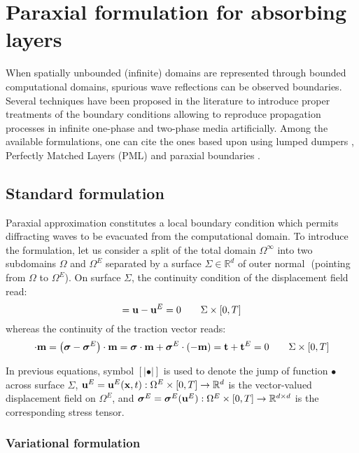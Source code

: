 \section{Paraxial formulation for absorbing layers}

When spatially unbounded (infinite) domains are represented through bounded computational domains, spurious wave reflections can be observed boundaries.
Several techniques have been proposed in the literature to introduce proper treatments of the boundary conditions allowing to reproduce propagation processes in infinite one-phase and two-phase media artificially. Among the available formulations, one can cite the ones based upon using lumped dumpers \cite{lysmer1969finite}, Perfectly Matched Layers
(PML) \cite{berenger1994perfectly} and paraxial boundaries \cite{engquist1977absorbing,clayton1977absorbing,aubry1985local,MODARESSI1994117}.

\subsection{Standard formulation}

Paraxial approximation constitutes a local boundary condition which permits diffracting waves to be evacuated from the computational domain. To introduce the formulation, let us consider a split of the total domain $\Omega^{\infty}$ into two subdomains $\Omega$ and $\Omega^{E}$ separated by a surface $\Sigma\in\mathbb{R}^{d}$ of outer normal $\bm{}$ (pointing from $\Omega$ to $\Omega^{E}$). On surface $\Sigma$, the continuity condition of the displacement field read:
\begin{equation}
[|\bu|]=\bu-\bu^{E}=0\qquad\Sigma\times[0,T]
\end{equation}
%
whereas the continuity of the traction vector reads:
%
\begin{equation}
[|\bsigma|]\cdot\bm{}=\left(\bsigma-\bsigma^{E}\right)\cdot\bm{}=\bsigma\cdot\bm{}+\bsigma^{E}\cdot(-\bm{})=\bt+\bt^{E}=0\qquad\Sigma\times[0,T]\label{eq:paraxial_continuity_t}
\end{equation}

In previous equations, symbol $[|\bullet|]$ is used to denote the jump of function $\bullet$ across surface $\Sigma$, ${\bf{u}}^{E}={\bf{u}}^{E}({\bf{x}},t):\Omega^{E}\times[0,T]\to\mathbb{R}^{d}$ is the vector-valued displacement field on $\Omega^{E}$, and $\mbox{\boldmath${\sigma}$}^{E}=\mbox{\boldmath${\sigma}$}^{E}({\bf{u}}^{E}):\Omega^{E}\times[0,T]\to\mathbb{R}^{d\times d}$ is the corresponding stress tensor.

\subsubsection{Variational formulation}

